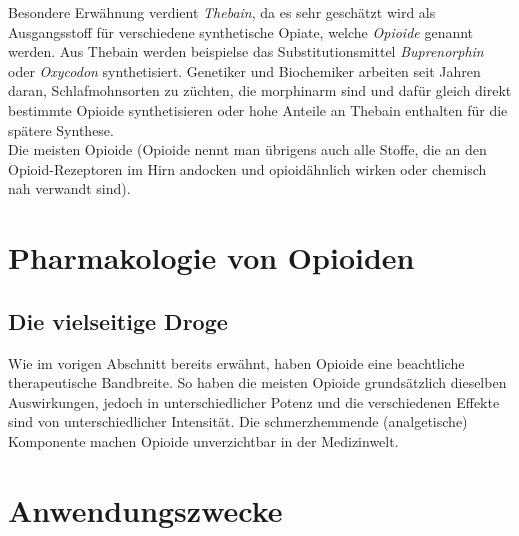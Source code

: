 \documentclass[b5paper,10pt,dvips,fleqn,titlepage,twoside]{book}
\begin{document}
Besondere Erwähnung verdient \emph{Thebain}, da es sehr geschätzt wird als Ausgangsstoff für verschiedene synthetische Opiate, welche \emph{Opioide} genannt werden. Aus Thebain werden beispielse das Substitutionsmittel \emph{Buprenorphin} oder \emph{Oxycodon} synthetisiert. Genetiker und Biochemiker arbeiten seit Jahren daran, Schlafmohnsorten zu züchten, die morphinarm sind und dafür gleich direkt bestimmte Opioide synthetisieren oder hohe Anteile an Thebain enthalten für die spätere Synthese.\\
Die meisten Opioide (Opioide nennt man übrigens auch alle Stoffe, die an den Opioid-Rezeptoren im Hirn andocken und opioidähnlich wirken oder chemisch nah verwandt sind).
\chapter{Pharmakologie von Opioiden}
\section{Die vielseitige Droge}
Wie im vorigen Abschnitt bereits erwähnt, haben Opioide eine beachtliche therapeutische Bandbreite.
So haben die meisten Opioide grundsätzlich dieselben Auswirkungen, jedoch in unterschiedlicher Potenz und die verschiedenen Effekte sind von unterschiedlicher Intensität.
Die schmerzhemmende (analgetische) Komponente machen Opioide unverzichtbar in der Medizinwelt.
\chapter{Anwendungszwecke}
\end{document}
